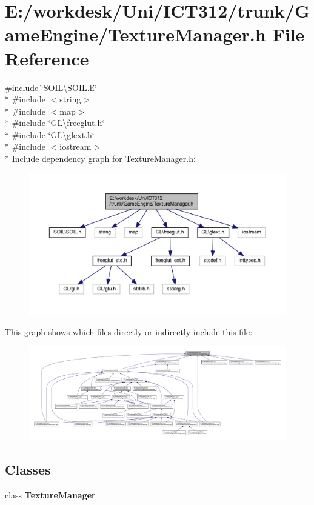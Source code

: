 \section{E\+:/workdesk/\+Uni/\+I\+C\+T312/trunk/\+Game\+Engine/\+Texture\+Manager.h File Reference}
\label{_texture_manager_8h}
{\ttfamily \#include \char`\"{}S\+O\+I\+L\textbackslash{}\+S\+O\+I\+L.\+h\char`\"{}}\\*
{\ttfamily \#include $<$string$>$}\\*
{\ttfamily \#include $<$map$>$}\\*
{\ttfamily \#include \char`\"{}G\+L\textbackslash{}freeglut.\+h\char`\"{}}\\*
{\ttfamily \#include \char`\"{}G\+L\textbackslash{}glext.\+h\char`\"{}}\\*
{\ttfamily \#include $<$iostream$>$}\\*
Include dependency graph for Texture\+Manager.\+h\+:\nopagebreak
\begin{figure}[H]
\begin{center}
\leavevmode
\includegraphics[width=350pt]{d3/d37/_texture_manager_8h__incl}
\end{center}
\end{figure}
This graph shows which files directly or indirectly include this file\+:
\nopagebreak
\begin{figure}[H]
\begin{center}
\leavevmode
\includegraphics[width=350pt]{df/d98/_texture_manager_8h__dep__incl}
\end{center}
\end{figure}
\subsection*{Classes}
\begin{DoxyCompactItemize}
\item 
class {\bf Texture\+Manager}
\end{DoxyCompactItemize}
